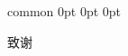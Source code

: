 \documentclass[
    report,     %
    oneside,    %
    UTF8,       %
    zihao=-4    %
]{config}
\begin{document}

\Footer
    {common} %
    {0pt} %
    {0pt} %
    {0pt} %
    {} %
    {\thepage} %
    {} %




\StartAcknowledgements %

致谢
\end{document}
